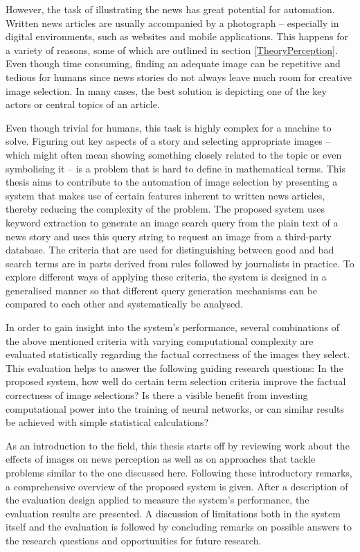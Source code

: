 \documentclass[11pt,a4paper,twoside]{article}
\begin{document}
However, the task of illustrating the news has great potential for automation. Written news articles are usually accompanied by a photograph -- especially in digital environments, such as websites and mobile applications. This happens for a variety of reasons, some of which are outlined in section \ref{TheoryPerception}. Even though time consuming, finding an adequate image can be repetitive and tedious for humans since news stories do not always leave much room for creative image selection. In many cases, the best solution is depicting one of the key actors or central topics of an article.

Even though trivial for humans, this task is highly complex for a machine to solve. Figuring out key aspects of a story and selecting appropriate images -- which might often mean showing something closely related to the topic or even symbolising it -- is a problem that is hard to define in mathematical terms. This thesis aims to contribute to the automation of image selection by presenting a system that makes use of certain features inherent to written news articles, thereby reducing the complexity of the problem. The proposed system uses keyword extraction to generate an image search query from the plain text of a news story and uses this query string to request an image from a third-party database. The criteria that are used for distinguishing between good and bad search terms are in parts derived from rules followed by journalists in practice. To explore different ways of applying these criteria, the system is designed in a generalised manner so that different query generation mechanisms can be compared to each other and systematically be analysed.

In order to gain insight into the system's performance, several combinations of the above mentioned criteria with varying computational complexity are evaluated statistically regarding the factual correctness of the images they select. This evaluation helps to answer the following guiding research questions: In the proposed system, how well do certain term selection criteria improve the factual correctness of image selections? Is there a visible benefit from investing computational power into the training of neural networks, or can similar results be achieved with simple statistical calculations?

\bigskip

As an introduction to the field, this thesis starts off by reviewing work about the effects of images on news perception as well as on approaches that tackle problems similar to the one discussed here. Following these introductory remarks, a comprehensive overview of the proposed system is given. After a description of the evaluation design applied to measure the system's performance, the evaluation results are presented. A discussion of limitations both in the system itself and the evaluation is followed by concluding remarks on possible answers to the research questions and opportunities for future research.
\end{document}
